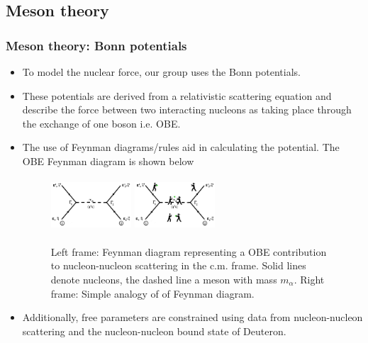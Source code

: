 \documentclass[10pt,serif]{beamer}
\begin{document}
\subsection{Meson theory}
\begin{frame}
\frametitle{Meson theory: Bonn potentials}
\begin{itemize}
\item To model the nuclear force, our group uses the Bonn potentials.
\item These potentials are derived from a relativistic scattering equation and describe the force between two interacting nucleons as taking place through the \alert{exchange} of \alert{one} \alert{boson} i.e. \alert{OBE}.
\item The use of Feynman diagrams/rules \alert{aid} in calculating the potential. The OBE Feynman diagram is shown below
\begin{figure}[!h]
\centering
\includegraphics[width=3cm,height=2cm]{feynman.jpg}
\hspace{1cm}
\includegraphics[width=3cm,height=2cm]{feynman_explain.jpg}
\caption{\scriptsize{Left frame: Feynman diagram representing a OBE contribution to nucleon-nucleon scattering in the c.m. frame. Solid lines denote nucleons, the dashed line a meson with mass $m_\alpha$. Right frame: Simple analogy of of Feynman diagram.}}
\end{figure}
\item Additionally, free parameters are constrained using data from nucleon-nucleon scattering and the nucleon-nucleon bound state of Deuteron.
\end{itemize}
\end{frame}
\end{document}
